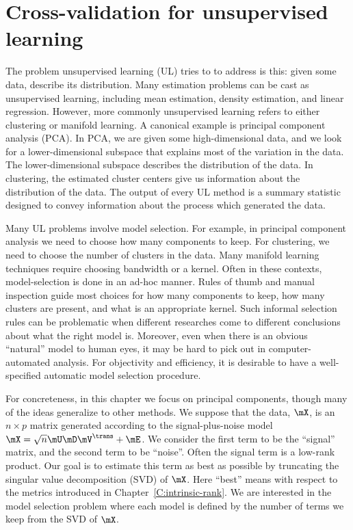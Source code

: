 
\chapter{Cross-validation for unsupervised learning}\label{C:cvul}

The problem unsupervised learning (UL) tries to to address is this: given some
data, describe its distribution. Many estimation problems can be cast as
unsupervised learning, including mean estimation, density estimation, and
linear regression. However, more commonly unsupervised learning refers to
either clustering or manifold learning. A canonical example is principal
component analysis (PCA). In PCA, we are given some high-dimensional data,
and we look for a lower-dimensional subspace that explains most of the
variation in the data. The lower-dimensional subspace describes the
distribution of the data. In clustering, the estimated cluster centers give us
information about the distribution of the data. The output of every UL method
is a summary statistic designed to convey information about the process which
generated the data.

Many UL problems involve model selection. For example, in principal component
analysis we need to choose how many components to keep. For clustering, we
need to choose the number of clusters in the data. Many manifold learning
techniques require choosing bandwidth or a kernel. Often in these contexts,
model-selection is done in an ad-hoc manner. Rules of thumb and manual
inspection guide most choices for how many components to keep, how many
clusters are present, and what is an appropriate kernel. Such informal
selection rules can be problematic when different researches come to different
conclusions about what the right model is. Moreover, even when there is an
obvious ``natural'' model to human eyes, it may be hard to pick out in
computer-automated analysis. For objectivity and efficiency, it is desirable to have a well-specified automatic model selection procedure.

For concreteness, in this chapter we focus on principal components, though
many of the ideas generalize to other methods. We suppose that the data,
$\mX$, is an $n \times p$ matrix generated according to the signal-plus-noise
model $\mX = \sqrt{n} \mU \mD \mV^\trans + \mE$. We consider the first term to
be the ``signal'' matrix, and the second term to be ``noise''. Often the
signal term is a low-rank product. Our goal is to estimate this term as
best as possible by truncating the singular value decomposition (SVD) of
$\mX$. Here ``best'' means with respect to the metrics introduced in
Chapter~\ref{C:intrinsic-rank}. We are interested in the model selection
problem where each model is defined by the number of terms we keep from the
SVD of $\mX$.

